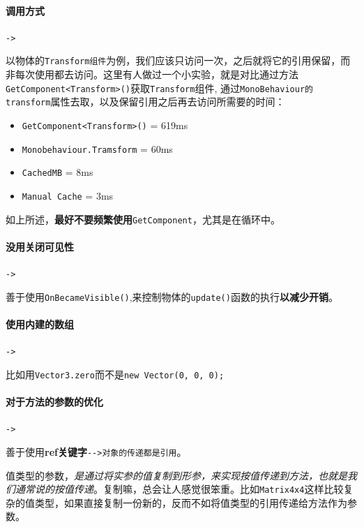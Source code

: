 \documentclass[UTF8,a4paper,12pt]{ctexart}
\begin{document}
  			\paragraph{调用方式}\verb|->|
  			
	  			以物体的\verb|Transform组件|为例，我们应该只访问一次，之后就将它的引用保留，而非每次使用都去访问。这里有人做过一个小实验，就是对比通过方法\verb|GetComponent<Transform>()|获取\verb|Transform|组件, 通过\verb|MonoBehaviour的transform|属性去取，以及保留引用之后再去访问所需要的时间：
	  				\begin{itemize}
	  					\item \verb|GetComponent<Transform>()| = 619ms
	  					\item \verb|Monobehaviour.Tramsform| = 60ms
	  					\item \verb|CachedMB| = 8ms
	  					\item \verb|Manual Cache| = 3ms
	  				\end{itemize}
	  			
  				如上所述，\textbf{最好不要频繁使用}\verb|GetComponent|，尤其是在循环中。
  			
  			\paragraph{没用关闭可见性}\verb|->|
  			
  				善于使用\verb|OnBecameVisible()|,来控制物体的\verb|update()|函数的执行\textbf{以减少开销}。
  			
  			\paragraph{使用内建的数组}\verb|->|
  			
  				比如用\verb|Vector3.zero|而不是\verb|new Vector(0, 0, 0);|
  			
  			\paragraph{对于方法的参数的优化}\verb|->|
  			
  				善于使用\textbf{ref关键字}\verb|-->对象的传递都是引用|。
  				
  				值类型的参数，\textit{是通过将实参的值复制到形参，来实现按值传递到方法，也就是我们通常说的按值传递}。复制嘛，总会让人感觉很笨重。比如\verb|Matrix4x4|这样比较复杂的值类型，如果直接复制一份新的，反而不如将值类型的引用传递给方法作为参数。
  	
\end{document}
